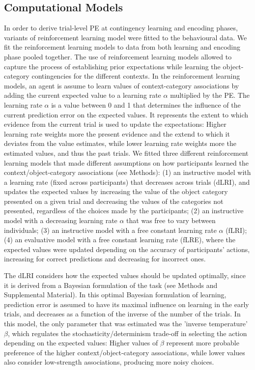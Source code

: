 \documentclass[a4paper,12pt]{article}
\begin{document}
\subsection{Computational Models}
In order to derive trial-level PE at contingency learning and encoding phases, variants of reinforcement learning model \citep{Sutton2018a} were fitted to the behavioural data. We fit the reinforcement learning models to data from both learning and encoding phase pooled together. The use of reinforcement learning models allowed to capture the process of establishing prior expectations while learning the object-category contingencies for the different contexts. In the reinforcement learning models, an agent is assume to learn values of context-category associations by adding the current expected value to a learning rate $\alpha$ multiplied by the PE. The learning rate $\alpha$ is a value between 0 and 1 that determines the influence of the current prediction error on the expected values. It represents the extent to which evidence from the current trial is used to update the expectations: Higher learning rate weights more the present evidence and the extend to which it deviates from the value estimates, while lower learning rate weights more the estimated values, and thus the past trials.  We fitted three different reinforcement learning models that made different assumptions on how participants learned the context/object-category associations (see Methods): (1) an instructive model with a learning rate (fixed across participants) that decreases across trials (dLRI), and updates the expected values by increasing the value of the object category presented on a given trial and decreasing the values of the categories not presented, regardless of the choices made by the participants; (2) an instructive model with a decreasing learning rate  $\alpha$ that was free to vary between individuals; (3) an instructive model with a free constant learning rate $\alpha$ (fLRI); (4) an evaluative model with a free constant learning rate (fLRE), where the expected values were updated depending on the accuracy of participants' actions, increasing for correct predictions and decreasing for incorrect ones. \par
The dLRI considers how the expected values should be updated optimally, since it is derived from a Bayesian formulation of the task (see Methods and Supplemental Material). In this optimal Bayesian formulation of learning, prediction error is assumed to have its maximal influence on learning in the early trials, and decreases as a function of the inverse of the number of the trials. In this model, the only parameter that was estimated was the 'inverse temperature' $\beta$, which regulates the stochasticity/determinism trade-off in selecting the action depending on the expected values: Higher values of $\beta$ represent more probable preference of the higher context/object-category associations, while lower values also consider low-strength associations, producing more noisy choices. 
\end{document}
